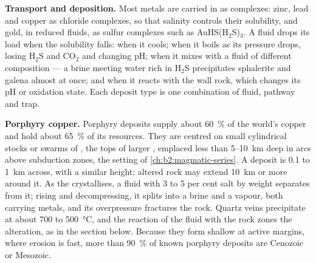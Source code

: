 \textbf{Transport and deposition.} Most metals are carried in  as complexes:
zinc, lead and copper as chloride complexes, so that salinity controls their solubility, and gold,
in reduced fluids, as sulfur complexes such as AuHS(H$_2$S)$_3$. A fluid drops its load when the
solubility falls: when it cools; when it boils as its pressure drops, losing H$_2$S and CO$_2$ and
changing pH; when it mixes with a fluid of different composition --- a brine meeting water rich
in H$_2$S precipitates sphalerite and galena almost at once; and when it reacts with the wall
rock, which changes its pH or oxidation state. Each deposit type is one combination of fluid,
pathway and trap.

\textbf{Porphyry copper.} Porphyry deposits supply about \qty{60}{\percent} of the world's
copper and hold about \qty{65}{\percent} of its resources. They are centred on small cylindrical
stocks or swarms of , the tops of larger , emplaced less than 5--\qty{10}{km} deep in
arcs above subduction zones, the setting of \cref{ch:b2:magmatic-series}. A deposit is 0.1 to
\qty{1}{km} across, with a similar height; altered rock may extend \qty{10}{km} or more around it.
As the  crystallises, a fluid with 3 to 5 per cent salt by weight separates from it; rising and
decompressing, it splits into a brine and a vapour, both carrying metals, and its overpressure
fractures the rock. Quartz veins precipitate at about 700 to \qty{500}{\celsius}, and the
reaction of the fluid with the rock zones the alteration, as in the section below. Because they
form shallow at active margins, where erosion is fast, more than \qty{90}{\percent} of known
porphyry deposits are Cenozoic or Mesozoic.

